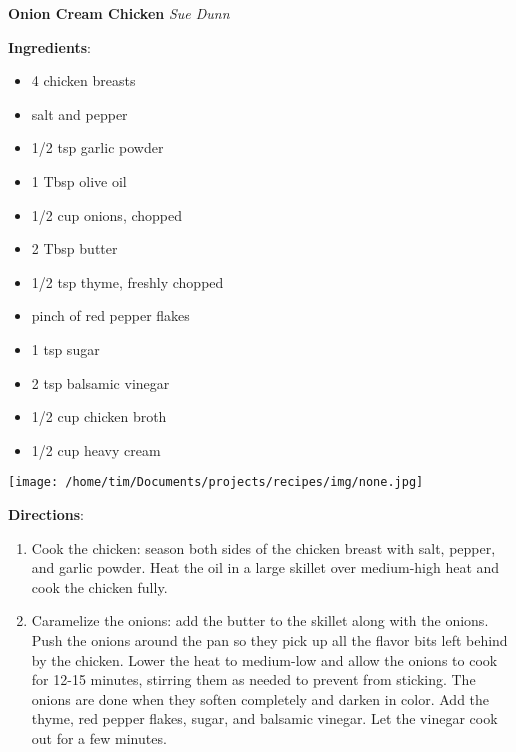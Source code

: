 \documentclass[11pt, twoside, openany]{book}
\begin{document}
\noindent\begin{minipage}[t]{\linewidth}%
{\Large\textbf{Onion Cream Chicken}} \label{onion-cream-chicken}\hfill\textit{Sue Dunn}\\
\noindent\begin{minipage}[t]{0.78\linewidth}%
\textbf{Ingredients}:\vspace{-3mm}
\begin{multicols}{2}
\begin{itemize}\setlength\itemsep{-1mm}
\item 4 chicken breasts
\item salt and pepper
\item 1/2 tsp garlic powder
\item 1 Tbsp olive oil
\item 1/2 cup onions, chopped
\item 2 Tbsp butter
\item 1/2 tsp thyme, freshly chopped
\item pinch of red pepper flakes
\item 1 tsp sugar
\item 2 tsp balsamic vinegar
\item 1/2 cup chicken broth
\item 1/2 cup heavy cream
\end{itemize}
\end{multicols}
\end{minipage}
\noindent\begin{minipage}[t]{0.18\linewidth}
\centering \strut\vspace*{-\baselineskip}\newline
\texttt{[image: /home/tim/Documents/projects/recipes/img/none.jpg]}\\
\end{minipage}\vspace{3mm}
\textbf{Directions}:
\vspace{-3mm}\begin{enumerate}\setlength\itemsep{-1mm}
\item Cook the chicken: season both sides of the chicken breast with salt, pepper, and garlic powder. Heat the oil in a large skillet over medium-high heat and cook the chicken fully.
\item Caramelize the onions: add the butter to the skillet along with the onions. Push the onions around the pan so they pick up all the flavor bits left behind by the chicken. Lower the heat to medium-low and allow the onions to cook for 12-15 minutes, stirring them as needed to prevent from sticking. The onions are done when they soften completely and darken in color. Add the thyme, red pepper flakes, sugar, and balsamic vinegar. Let the vinegar cook out for a few minutes.

\end{enumerate}
\end{minipage}
\end{document}

